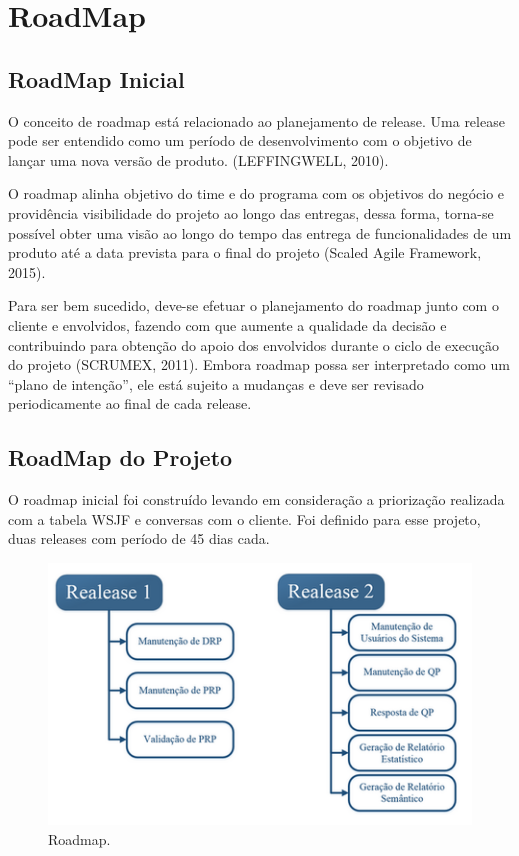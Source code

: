 \section{RoadMap}
	\subsection{RoadMap Inicial}

	O conceito de roadmap está relacionado ao planejamento de release. Uma release pode ser entendido como um período de desenvolvimento com o objetivo de lançar uma nova versão de produto. (LEFFINGWELL, 2010). 

	O roadmap alinha objetivo do time e do programa com os objetivos do negócio e providência visibilidade do projeto ao longo das entregas, dessa forma, torna-se possível obter uma visão ao longo do tempo das entrega de funcionalidades de um produto até a data prevista para o final do projeto (Scaled Agile Framework, 2015).

	Para ser bem sucedido, deve-se efetuar o planejamento do roadmap junto com o cliente e envolvidos, fazendo com que aumente a qualidade da decisão e contribuindo para obtenção do apoio dos envolvidos durante o ciclo de execução do projeto (SCRUMEX, 2011). 					
	Embora roadmap possa ser interpretado como um “plano de intenção”, ele está sujeito a mudanças e deve ser revisado periodicamente ao final de cada release.

	\subsection{RoadMap do Projeto}

	O roadmap inicial foi construído levando em consideração a priorização realizada com a tabela WSJF e conversas com o cliente. Foi definido para esse projeto, duas releases com período de 45 dias cada.

	\begin{figure}[h]
		\centering
		\includegraphics{imagens/roadmap1.png}
		\caption{Roadmap.}
		\label{imagem}
	\end{figure}

